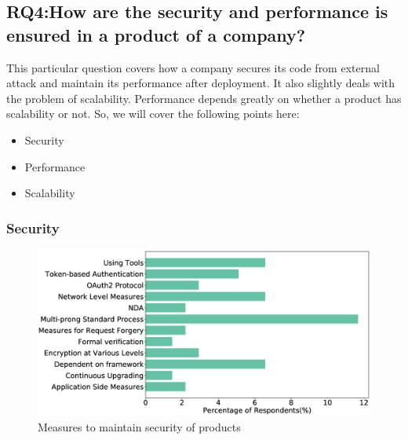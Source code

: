 \subsection{RQ4:How are the security and performance is ensured in
a product of a company?}
\label{RQ4}
This particular question covers how a company secures its code from external attack and maintain its performance after deployment. It also slightly deals with the problem of scalability. Performance depends greatly on whether a product has scalability or not. So, we will cover the following points here:
\begin{itemize}
    \item Security
    \item Performance
    \item Scalability
\end{itemize}
\subsubsection{Security}
\label{Security}
\begin{figure}[htbp]
\includegraphics[scale=0.28]{Figures/Security.eps} 
\caption{Measures to maintain security of products}
\label{fig:Measures to ensure security}
\end{figure}

